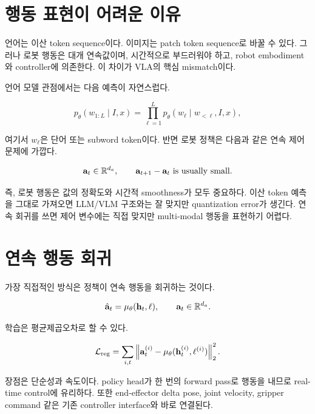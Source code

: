 \section{행동 표현이 어려운 이유}

언어는 이산 token sequence이다. 이미지는 patch token sequence로 바꿀 수 있다. 그러나 로봇 행동은 대개 연속값이며, 시간적으로 부드러워야 하고, robot embodiment와 controller에 의존한다. 이 차이가 VLA의 핵심 mismatch이다.

언어 모델 관점에서는 다음 예측이 자연스럽다.

\begin{equation}
  p_\theta(w_{1:L} \mid I, x)
  =
  \prod_{\ell=1}^{L}
  p_\theta(w_\ell \mid w_{<\ell}, I, x),
\end{equation}

여기서 $w_\ell$은 단어 또는 subword token이다. 반면 로봇 정책은 다음과 같은 연속 제어 문제에 가깝다.

\begin{equation}
  \mathbf{a}_t \in \mathbb{R}^{d_a},
  \qquad
  \mathbf{a}_{t+1} - \mathbf{a}_t \ \mathrm{is\ usually\ small}.
\end{equation}

즉, 로봇 행동은 값의 정확도와 시간적 smoothness가 모두 중요하다. 이산 token 예측을 그대로 가져오면 LLM/VLM 구조와는 잘 맞지만 quantization error가 생긴다. 연속 회귀를 쓰면 제어 변수에는 직접 맞지만 multi-modal 행동을 표현하기 어렵다.

\section{연속 행동 회귀}

가장 직접적인 방식은 정책이 연속 행동을 회귀하는 것이다.

\begin{equation}
  \hat{\mathbf{a}}_t
  =
  \mu_\theta(\mathbf{h}_t,\ell),
  \qquad
  \mathbf{a}_t \in \mathbb{R}^{d_a}.
\end{equation}

학습은 평균제곱오차로 할 수 있다.

\begin{equation}
  \mathcal{L}_{\mathrm{reg}}
  =
  \sum_{i,t}
  \left\|
  \mathbf{a}_t^{(i)}
  -
  \mu_\theta(\mathbf{h}_t^{(i)},\ell^{(i)})
  \right\|_2^2.
\end{equation}

장점은 단순성과 속도이다. policy head가 한 번의 forward pass로 행동을 내므로 real-time control에 유리하다. 또한 end-effector delta pose, joint velocity, gripper command 같은 기존 controller interface와 바로 연결된다.


